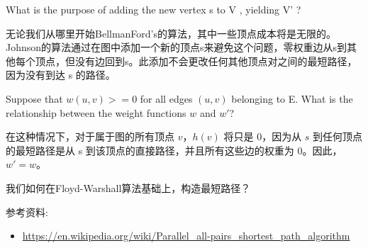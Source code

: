 \documentclass[a4paper, justified]{tufte-handout}
\begin{document}
\begin{problem}[TC 25.3-2]
What is the purpose of adding the new vertex s to V , yielding V' ?
\end{problem}

\begin{solution}
  无论我们从哪里开始BellmanFord's的算法，其中一些顶点成本将是无限的。Johnson的算法通过在图中添加一个新的顶点s来避免这个问题，零权重边从s到其他每个顶点，但没有边回到s。此添加不会更改任何其他顶点对之间的最短路径，因为没有到达 s 的路径。
\end{solution}

\begin{problem}[TC 25.3-3]
Suppose that $w(u,v) >= 0$ for all edges $(u,v)$ belonging to E. What is the relationship between the weight functions $w$ and $w'$?
\end{problem}

\begin{solution}
  在这种情况下，对于属于图的所有顶点 $v$，$h(v)$ 将只是 0，因为从 $s$ 到任何顶点的最短路径是从 s 到该顶点的直接路径，并且所有这些边的权重为 0。因此，$w' = w$。
\end{solution}



\beginoptional

\begin{problem}[TC Problem 25-2]
\end{problem}

\begin{solution}
\end{solution}


\beginot
\begin{ot}
  我们如何在Floyd-Warshall算法基础上，构造最短路径？


\end{ot}


\begin{ot}
  \noindent 参考资料:
  \begin{itemize}
    \item \href{https://en.wikipedia.org/wiki/Parallel_all-pairs_shortest_path_algorithm}{https://en.wikipedia.org/wiki/Parallel\_all-pairs\_shortest\_path\_algorithm}
  \end{itemize}

\end{ot}
\end{document}
